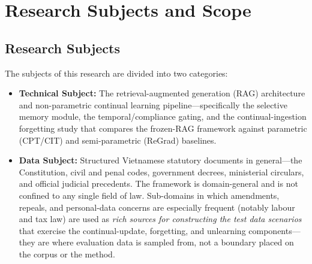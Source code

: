 \section{Research Subjects and Scope}

\subsection{Research Subjects}
The subjects of this research are divided into two categories:
\begin{itemize}
    \item \textbf{Technical Subject:} The retrieval-augmented generation (RAG) architecture and non-parametric continual learning pipeline---specifically the selective memory module, the temporal/compliance gating, and the continual-ingestion forgetting study that compares the frozen-RAG framework against parametric (CPT/CIT) and semi-parametric (ReGrad) baselines.
    \item \textbf{Data Subject:} Structured Vietnamese statutory documents in general---the Constitution, civil and penal codes, government decrees, ministerial circulars, and official judicial precedents. The framework is domain-general and is not confined to any single field of law. Sub-domains in which amendments, repeals, and personal-data concerns are especially frequent (notably labour and tax law) are used as \emph{rich sources for constructing the test data scenarios} that exercise the continual-update, forgetting, and unlearning components---they are where evaluation data is sampled from, not a boundary placed on the corpus or the method.
\end{itemize}

